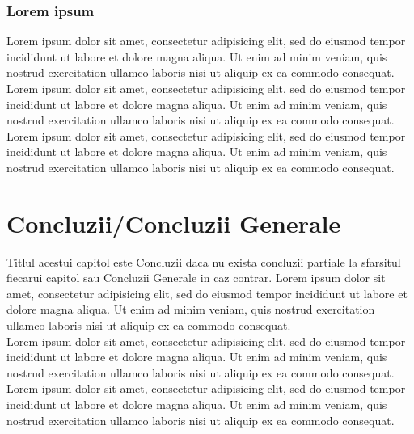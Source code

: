 \documentclass[12pt,openright,twoside]{book}
\renewcommand{\contentsname}{{\Huge Cuprins}}
\begin{document}
\subsection{Lorem ipsum }

Lorem ipsum dolor sit amet, consectetur adipisicing elit, sed do eiusmod tempor incididunt ut labore et dolore magna aliqua. Ut enim ad minim veniam, quis nostrud exercitation ullamco laboris nisi ut aliquip ex ea commodo consequat.\\

Lorem ipsum dolor sit amet, consectetur adipisicing elit, sed do eiusmod tempor incididunt ut labore et dolore magna aliqua. Ut enim ad minim veniam, quis nostrud exercitation ullamco laboris nisi ut aliquip ex ea commodo consequat.\\

Lorem ipsum dolor sit amet, consectetur adipisicing elit, sed do eiusmod tempor incididunt ut labore et dolore magna aliqua. Ut enim ad minim veniam, quis nostrud exercitation ullamco laboris nisi ut aliquip ex ea commodo consequat.\\


\chapter{Concluzii/Concluzii Generale}

Titlul acestui capitol este Concluzii daca nu exista concluzii partiale la sfarsitul fiecarui capitol sau Concluzii Generale in caz contrar. Lorem ipsum dolor sit amet, consectetur adipisicing elit, sed do eiusmod tempor incididunt ut labore et dolore magna aliqua. Ut enim ad minim veniam, quis nostrud exercitation ullamco laboris nisi ut aliquip ex ea commodo consequat.\\

Lorem ipsum dolor sit amet, consectetur adipisicing elit, sed do eiusmod tempor incididunt ut labore et dolore magna aliqua. Ut enim ad minim veniam, quis nostrud exercitation ullamco laboris nisi ut aliquip ex ea commodo consequat.\\

Lorem ipsum dolor sit amet, consectetur adipisicing elit, sed do eiusmod tempor incididunt ut labore et dolore magna aliqua. Ut enim ad minim veniam, quis nostrud exercitation ullamco laboris nisi ut aliquip ex ea commodo consequat.\\







\renewcommand{\contentsname}{Referin\c{t}e}
\renewcommand\bibname{Referin\c{t}e} %

%
%


\end{document}
